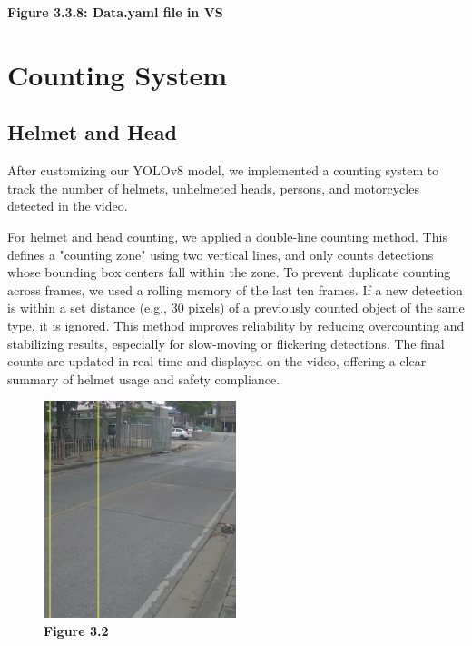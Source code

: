 \begin{itemize}
\begin{center}
		\vspace{0.5em}
		\textbf{Figure 3.3.8:  Data.yaml file in VS}
	\end{center}
\end{itemize}

\section{\textbf{Counting System}}
\subsection{Helmet and Head}

\noindent\hspace{2.5em}After customizing our YOLOv8 model, we implemented a counting system to track the number of helmets, unhelmeted heads, persons, and motorcycles detected in the video.


\noindent\hspace{2.5em}For helmet and head counting, we applied a double-line counting method. This defines a "counting zone" using two vertical lines, and only counts detections whose bounding box centers fall within the zone. To prevent duplicate counting across frames, we used a rolling memory of the last ten frames. If a new detection is within a set distance (e.g., 30 pixels) of a previously counted object of the same type, it is ignored.
\newline
This method improves reliability by reducing overcounting and stabilizing results, especially for slow-moving or flickering detections. The final counts are updated in real time and displayed on the video, offering a clear summary of helmet usage and safety compliance.
\begin{figure}[H] %
	\centering
	\includegraphics[width=0.5\textwidth]{headhel1.png}
	\vspace{0.5em}
	\caption*{\textbf{Figure 3.2}}
\end{figure}
\hfill

